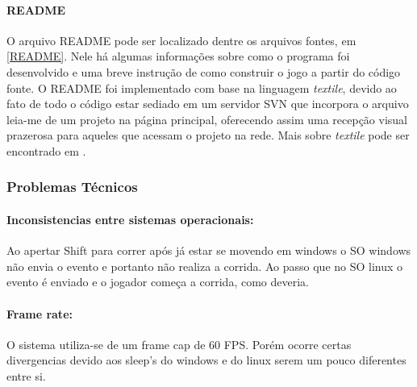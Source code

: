 \paragraph{\textbf{README}}

O arquivo README pode ser localizado dentre os arquivos fontes, em \ref{README}. Nele há algumas informações sobre como o programa foi desenvolvido e uma breve instrução de como construir o jogo a partir do código fonte. O README foi implementado com base na linguagem \textit{textile}, devido ao fato de todo o código estar sediado em um servidor SVN que incorpora o arquivo leia-me de um projeto na página principal, oferecendo assim uma recepção visual prazerosa para aqueles que acessam o projeto na rede. Mais sobre \textit{textile} pode ser encontrado em \cite{textile}.

\subsubsection{Problemas Técnicos}\label{problens}

\paragraph{\textbf{Inconsistencias entre sistemas operacionais:}}
Ao apertar Shift para correr após já estar se movendo em windows o SO windows 
não envia o evento e portanto não realiza a corrida. Ao passo que no SO linux o evento 
é enviado e o jogador começa a corrida, como deveria.

\paragraph{\textbf{Frame rate:}}
O sistema utiliza-se de um frame cap de 60 FPS. Porém ocorre certas divergencias 
devido aos sleep's do windows e do linux serem um pouco diferentes entre si.



